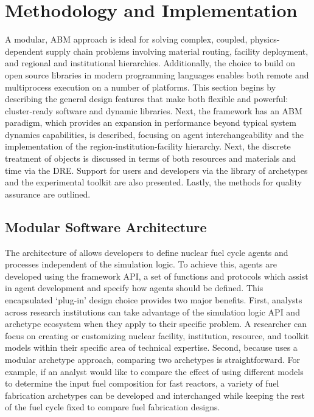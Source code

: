 \section{Methodology and Implementation}

A modular, \acrfull{ABM} approach is ideal for solving complex, coupled,
physics-dependent supply chain problems involving material routing, facility
deployment, and regional and institutional hierarchies. Additionally, the choice to
build \Cyclus on open source libraries in modern programming languages enables
both remote and multiprocess execution on a number of platforms. This section begins by
describing the general design features that make \Cyclus both flexible and powerful:
cluster-ready software and dynamic libraries.  Next, the framework has an
\gls{ABM} paradigm, which provides an expansion in performance beyond typical system dynamics
capabilities, is described, focusing on agent interchangeability and the
implementation of the region-institution-facility hierarchy.
Next, the discrete treatment of objects is discussed in terms of both
resources and materials and time via the \gls{DRE}.
Support for users and developers via the \Cycamore library of
archetypes and the experimental toolkit are also presented.
Lastly, the methods for quality assurance are outlined.

\subsection{Modular Software Architecture}

The architecture of \Cyclus allows developers to define nuclear fuel cycle
agents and processes independent of the simulation logic. To achieve this,
agents are developed using the \Cyclus framework \gls{API}, a set of functions
and protocols which assist in agent development and specify how agents should be
defined.  This encapsulated `plug-in' design choice provides two major
benefits. First, analysts across research institutions can take advantage of the
simulation logic \gls{API} and archetype ecosystem when they apply \Cyclus to
their specific problem.  A researcher can focus on creating or customizing
nuclear facility, institution, resource, and toolkit models within their
specific area of technical expertise. Second, because \Cyclus uses a modular
archetype approach, comparing two archetypes is straightforward. For example, if
an analyst would like to compare the effect of using different models to
determine the input fuel composition for fast reactors, a variety of fuel
fabrication archetypes can be developed and interchanged while keeping the rest
of the fuel cycle fixed to compare fuel fabrication designs.

